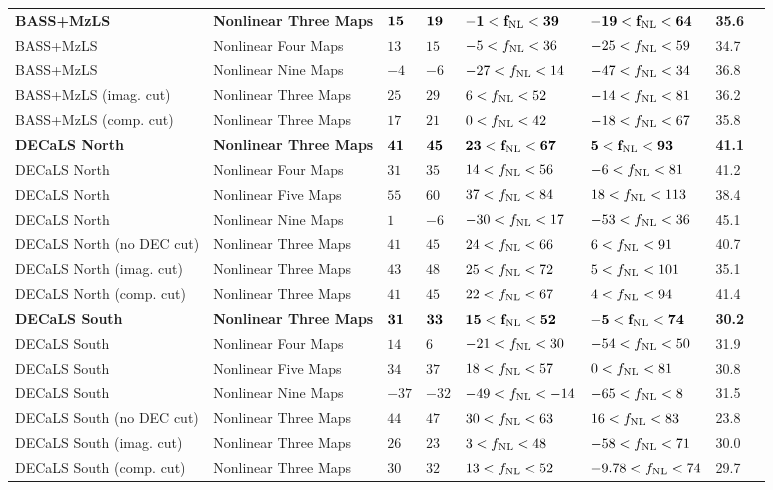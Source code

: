 \begin{table*}
{\begin{tabular}{llllllll}
\hline
\bf{BASS+MzLS}                 & \bf{Nonlinear Three Maps}& $ \bf{15}$& $ \bf{19}$& $ \bf{-1<f_{\rm NL}< 39}$& $\bf{-19<f_{\rm NL}< 64}$ & \bf{35.6}\\
BASS+MzLS                 & Nonlinear Four Maps& $ 13$& $ 15$& $ -5<f_{\rm NL}< 36$& $-25<f_{\rm NL}< 59$ &   34.7\\
BASS+MzLS                 & Nonlinear Nine Maps& $ -4$& $ -6$& $-27<f_{\rm NL}< 14$& $-47<f_{\rm NL}< 34$ &   36.8\\
BASS+MzLS (imag. cut)     & Nonlinear Three Maps& $ 25$& $ 29$& $  6<f_{\rm NL}< 52$& $-14<f_{\rm NL}< 81$ &   36.2\\
BASS+MzLS (comp. cut)     & Nonlinear Three Maps& $ 17$& $ 21$& $  0<f_{\rm NL}< 42$& $-18<f_{\rm NL}< 67$ &   35.8\\
\bf{DECaLS North}              & \bf{Nonlinear Three Maps}& $ \bf{41}$& $ \bf{45}$& $ \bf{23<f_{\rm NL}< 67}$& $  \bf{5<f_{\rm NL}< 93}$ & \bf{41.1}\\
DECaLS North              & Nonlinear Four Maps& $ 31$& $ 35$& $ 14<f_{\rm NL}< 56$& $ -6<f_{\rm NL}< 81$ &   41.2\\
DECaLS North              & Nonlinear Five Maps& $ 55$& $ 60$& $ 37<f_{\rm NL}< 84$& $ 18<f_{\rm NL}<113$ &   38.4\\
DECaLS North              & Nonlinear Nine Maps& $  1$& $ -6$& $-30<f_{\rm NL}< 17$& $-53<f_{\rm NL}< 36$ &   45.1\\
DECaLS North (no DEC cut) & Nonlinear Three Maps& $ 41$& $ 45$& $ 24<f_{\rm NL}< 66$& $  6<f_{\rm NL}< 91$ &   40.7\\
DECaLS North (imag. cut)  & Nonlinear Three Maps& $ 43$& $ 48$& $ 25<f_{\rm NL}< 72$& $  5<f_{\rm NL}<101$ &   35.1\\
DECaLS North (comp. cut)  & Nonlinear Three Maps& $ 41$& $ 45$& $ 22<f_{\rm NL}< 67$& $  4<f_{\rm NL}< 94$ &   41.4\\
\bf{DECaLS South}              & \bf{Nonlinear Three Maps}& $ \bf{31}$& $ \bf{33}$& $ \bf{15<f_{\rm NL}< 52}$& $ \bf{-5<f_{\rm NL}< 74}$ &   \bf{30.2}\\
DECaLS South              & Nonlinear Four Maps& $ 14$& $  6$& $-21<f_{\rm NL}< 30$& $-54<f_{\rm NL}< 50$ &   31.9\\
DECaLS South              & Nonlinear Five Maps& $ 34$& $ 37$& $ 18<f_{\rm NL}< 57$& $ 0<f_{\rm NL}< 81$ &   30.8\\
DECaLS South              & Nonlinear Nine Maps& $-37$& $-32$& $-49<f_{\rm NL}<-14$& $-65<f_{\rm NL}<  8$ &   31.5\\
DECaLS South (no DEC cut) & Nonlinear Three Maps& $ 44$& $ 47$& $ 30<f_{\rm NL}< 63$& $ 16<f_{\rm NL}< 83$ &   23.8\\
DECaLS South (imag. cut)  & Nonlinear Three Maps& $ 26$& $ 23$& $  3<f_{\rm NL}< 48$& $-58<f_{\rm NL}< 71$ &   30.0\\
DECaLS South (comp. cut)  & Nonlinear Three Maps& $ 30$& $ 32$& $ 13<f_{\rm NL}< 52$& $ -9.78<f_{\rm NL}< 74$ &   29.7\\
   \hline
    \end{tabular}}
\end{table*}




